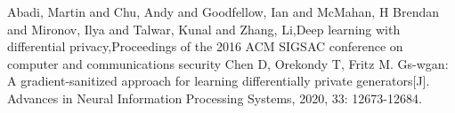 \documentclass[
    ngerman,american
    ]{scrartcl}
\newcommand{\lang}{en}
\begin{document}
    
      
        \sectionSource{\lang}
        \sectionSourceDescription{\lang}
        \begin{thebibliography}{99}
             Abadi, Martin and Chu, Andy and Goodfellow, Ian and McMahan, H Brendan and Mironov, Ilya and Talwar, Kunal and Zhang, Li,Deep learning with differential privacy,Proceedings of the 2016 ACM SIGSAC conference on computer and communications security
             Chen D, Orekondy T, Fritz M. Gs-wgan: A gradient-sanitized approach for learning differentially private generators[J]. Advances in Neural Information Processing Systems, 2020, 33: 12673-12684.

        \end{thebibliography}
\end{document}
